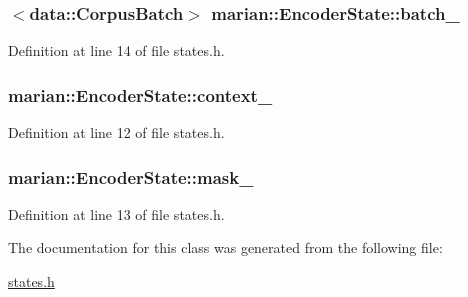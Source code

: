 \subsubsection[{\texorpdfstring{batch\+\_\+}{batch_}}]{$<${\bf data\+::\+Corpus\+Batch}$>$ marian\+::\+Encoder\+State\+::batch\+\_\+\hspace{0.3cm}{\ttfamily [private]}}\hypertarget{classmarian_1_1EncoderState_a3b4d9affb9f1a1c4aab541276784fc81}{}\label{classmarian_1_1EncoderState_a3b4d9affb9f1a1c4aab541276784fc81}


Definition at line 14 of file states.\+h.

\subsubsection[{\texorpdfstring{context\+\_\+}{context_}}]{ marian\+::\+Encoder\+State\+::context\+\_\+\hspace{0.3cm}{\ttfamily [private]}}\hypertarget{classmarian_1_1EncoderState_a90dbe742e85a1a406d26a4fd5ebac856}{}\label{classmarian_1_1EncoderState_a90dbe742e85a1a406d26a4fd5ebac856}


Definition at line 12 of file states.\+h.

\subsubsection[{\texorpdfstring{mask\+\_\+}{mask_}}]{ marian\+::\+Encoder\+State\+::mask\+\_\+\hspace{0.3cm}{\ttfamily [private]}}\hypertarget{classmarian_1_1EncoderState_ade7acc9bb0a4f60b298fc93d0c786abb}{}\label{classmarian_1_1EncoderState_ade7acc9bb0a4f60b298fc93d0c786abb}


Definition at line 13 of file states.\+h.



The documentation for this class was generated from the following file\+:\begin{DoxyCompactItemize}
\item 
\hyperlink{states_8h}{states.\+h}\end{DoxyCompactItemize}
